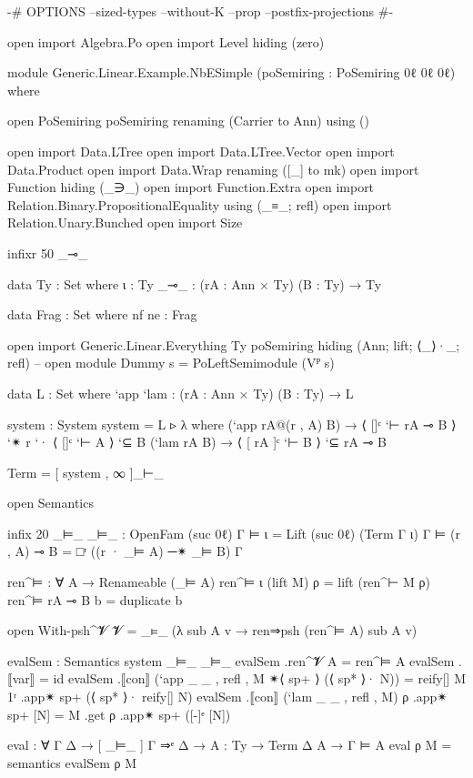 \begin{code}
{-# OPTIONS --sized-types --without-K --prop --postfix-projections #-}

open import Algebra.Po
open import Level hiding (zero)

module Generic.Linear.Example.NbESimple (poSemiring : PoSemiring 0ℓ 0ℓ 0ℓ) where

  open PoSemiring poSemiring renaming (Carrier to Ann) using ()

  open import Data.LTree
  open import Data.LTree.Vector
  open import Data.Product
  open import Data.Wrap renaming ([_] to mk)
  open import Function hiding (_∋_)
  open import Function.Extra
  open import Relation.Binary.PropositionalEquality using (_≡_; refl)
  open import Relation.Unary.Bunched
  open import Size

  infixr 50 _⊸_

  data Ty : Set where
    ι : Ty
    _⊸_ : (rA : Ann × Ty) (B : Ty) → Ty

  data Frag : Set where
    nf ne : Frag

  open import Generic.Linear.Everything Ty poSemiring
    hiding (Ann; lift; ⟨_⟩·_; refl)
  -- open module Dummy {s} = PoLeftSemimodule (Vᴾ s)

  data L : Set where
    `app `lam : (rA : Ann × Ty) (B : Ty) → L

  system : System
  system = L ▹ λ where
    (`app rA@(r , A) B) → ⟨ []ᶜ `⊢ rA ⊸ B ⟩ `✴ r `· ⟨ []ᶜ `⊢ A ⟩ `⊆ B
    (`lam rA B) → ⟨ [ rA ]ᶜ `⊢ B ⟩ `⊆ rA ⊸ B

  Term = [ system , ∞ ]_⊢_

  open Semantics

  infix 20 _⊨_
  _⊨_ : OpenFam (suc 0ℓ)
  Γ ⊨ ι = Lift (suc 0ℓ) (Term Γ ι)
  Γ ⊨ (r , A) ⊸ B = □ʳ ((r · _⊨ A) ─✴ _⊨ B) Γ

  ren^⊨ : ∀ {A} → Renameable (_⊨ A)
  ren^⊨ {ι} (lift M) ρ = lift (ren^⊢ M ρ)
  ren^⊨ {rA ⊸ B} b = duplicate b

  open With-psh^𝓥 {𝓥 = _⊨_} (λ sub {A} v → ren⇒psh (ren^⊨ {A}) sub {A} v)

  evalSem : Semantics system _⊨_ _⊨_
  evalSem .ren^𝓥 {A} = ren^⊨ {A}
  evalSem .⟦var⟧ = id
  evalSem .⟦con⟧ (`app _ _ , refl , M ✴⟨ sp+ ⟩ (⟨ sp* ⟩· N)) =
    reify[] M 1ʳ .app✴ sp+ (⟨ sp* ⟩· reify[] N)
  evalSem .⟦con⟧ (`lam _ _ , refl , M) ρ .app✴ sp+ [N] =
    M .get ρ .app✴ sp+ ([-]ᵉ [N])

  eval : ∀ {Γ Δ} → [ _⊨_ ] Γ ⇒ᵉ Δ → {A : Ty} → Term Δ A → Γ ⊨ A
  eval ρ M = semantics evalSem ρ M


\end{code}

